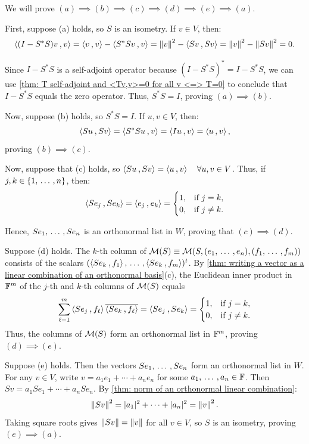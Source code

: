 \begin{prf}
  We will prove $(a) \implies (b) \implies (c) \implies (d) \implies (e) \implies (a)$.

  \StepOne First, suppose (a) holds, so $S$ is an isometry. If $v\in V$, then:
  \[
  \ip{(I-S^*S)v}{v} = \ip{v}{v} - \ip{S^*Sv}{v} = \norm{v}^2-\ip{Sv}{Sv} = \norm{v}^2 - \norm{Sv}^2 = 0.
  \]

  Since $I-S^*S$ is a self-adjoint operator because $(I-S^*S)^* = I-S^*S$, we can use \ref{thm: T self-adjoint and <Tv,v>=0 for all v <=> T=0} to conclude that $I-S^*S$ equals the zero operator. Thus, $S^*S = I$, proving $(a) \implies (b)$.

  \StepTwo Now, suppose (b) holds, so $S^*S=I$. If $u,v \in V$, then:
  \[
  \ip{Su}{Sv} = \ip{S^*Su}{v} = \ip{Iu}{v} = \ip{u}{v},
  \]
  proving $(b) \implies (c)$.

  \StepThree Now, suppose that (c) holds, so $\ip{Su}{Sv} = \ip{u}{v} \quad \forall u,v \in V$. Thus, if $j,k \in \{1, {\, \ldots \,\,}, n\}$, then:
  \[
  \ip{Se_j}{Se_k} = \ip{e_j}{e_k} = \begin{cases} 1, & \text{if } j = k, \\ 0, & \text{if } j \neq k. \end{cases}
  \]

  Hence, $Se_1, {\, \ldots \,\,}, Se_n$ is an orthonormal list in $W$, proving that $(c) \implies (d)$.

  \StepFour Suppose (d) holds. The $k$-th column of $\mathcal{M}(S) \equiv \mathcal{M}(S, (e_1, {\, \ldots \,\,}, e_n), (f_1, {\, \ldots \,\,}, f_m))$ consists of the scalars $(\ip{Se_k}{f_1}, \ddd, \ip{Se_k}{f_m})^t$. By \ref{thm: writing a vector as a linear combination of an orthonormal basis}(c), the Euclidean inner product in $\mathbb{F}^m$ of the $j$-th and $k$-th columns of $\mathcal{M}(S)$ equals
  \[
    \sum_{\ell=1}^m \ip{Se_j}{f_\ell} \overline{\ip{Se_k}{f_\ell}} = \ip{Se_j}{Se_k} = \begin{cases} 1, & \text{if } j = k, \\ 0, & \text{if } j \neq k. \end{cases}
  \]
  Thus, the columns of $\mathcal{M}(S)$ form an orthonormal list in $\mathbb{F}^m$, proving $(d) \implies (e)$.

  \StepFive Suppose (e) holds. Then the vectors $Se_1, {\, \ldots \,\,}, Se_n$ form an orthonormal list in $W$. For any $v \in V$, write $v = a_1 e_1 + \cdots + a_n e_n$ for some $a_1, {\, \ldots \,\,}, a_n \in \mathbb{F}$. Then $Sv = a_1 Se_1 + \cdots + a_n Se_n$. By \ref{thm: norm of an orthonormal linear combination}:
  \[
    \left \lVert Sv \right \rVert^2 = |a_1|^2 + \cdots + |a_n|^2 = \left \lVert v \right \rVert^2.
  \]
  Taking square roots gives $\left \lVert Sv \right \rVert = \left \lVert v \right \rVert$ for all $v \in V$, so $S$ is an isometry, proving $(e) \implies (a)$.
\end{prf}

